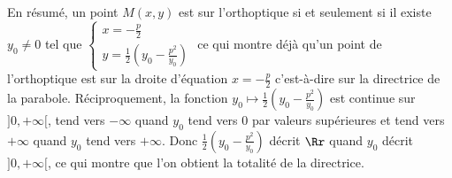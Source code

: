 {{En résumé, un point $M(x,y)$  est sur l'orthoptique si et seulement si il existe $y_0\neq0$ tel que  
$\left\{
\begin{array}{l}
x=-\frac{p}{2}\\
y=\frac{1}{2}\left(y_0-\frac{p^2}{y_0}\right)
\end{array}
\right.$ ce qui montre déjà qu'un point de l'orthoptique est sur la droite d'équation $x = -\frac{p}{2}$  c'est-à-dire sur la directrice de la parabole. Réciproquement, la fonction $y_0\mapsto\frac{1}{2}\left(y_0-\frac{p^2}{y_0}\right)$ est continue sur $]0,+\infty[$, tend vers $-\infty$ quand $y_0$ tend vers $0$ par valeurs supérieures et tend vers $+\infty$ quand $y_0$ tend vers $+\infty$. Donc   $\frac{1}{2}\left(y_0-\frac{p^2}{y_0}\right)$ décrit $\Rr$ quand $y_0$ décrit $]0,+\infty[$, ce qui montre que l'on obtient la totalité de la directrice.
}
}
